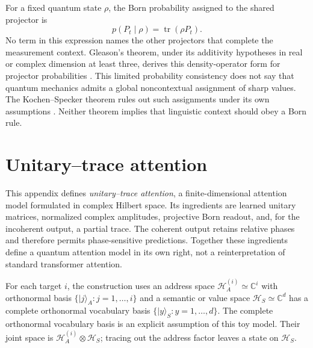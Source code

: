 \documentclass[
  aps,
  reprint,
  superscriptaddress,
  floatfix,
  nofootinbib,
  longbibliography
]{revtex4-2}
\begin{document}
For a fixed quantum state $\rho$, the Born probability assigned to the shared
projector is
\begin{equation}
 p(P_t\mid\rho)=\operatorname{tr}(\rho P_t).
 \label{eq:born-shared-app}
\end{equation}
No term in this expression names the other projectors that complete the
measurement context.  Gleason's theorem, under its additivity hypotheses in
real or complex dimension at least three, derives this density-operator form
for projector probabilities \cite{Gleason}.  This limited probability
consistency does not say that quantum mechanics admits a global
noncontextual assignment of sharp values.  The Kochen--Specker theorem rules
out such assignments under its own assumptions \cite{specker-60,kochen1}.
Neither theorem implies that linguistic context should obey a Born rule.


\section{Unitary--trace attention}
\label{app:quantum-attention}

This appendix defines \emph{unitary--trace attention}, a finite-dimensional
attention model formulated in complex Hilbert space.  Its ingredients are
learned unitary matrices, normalized complex amplitudes, projective Born
readout, and, for the incoherent output, a partial trace.  The coherent output
retains relative phases and therefore permits phase-sensitive predictions.
Together these ingredients define a quantum attention model in its own right,
not a reinterpretation of standard transformer attention.

For each target $i$, the construction uses an address space
$\mathcal H_A^{(i)}\simeq\mathbb C^i$ with orthonormal basis
$\{|j\rangle_A:j=1,\ldots,i\}$ and a semantic or value space
$\mathcal H_S\simeq\mathbb C^d$ has a complete orthonormal vocabulary basis
$\{|y\rangle_S:y=1,\ldots,d\}$.  The complete orthonormal vocabulary basis is
an explicit assumption of this toy model.  Their joint space is
$\mathcal H_A^{(i)}\otimes\mathcal H_S$; tracing out the address factor leaves
a state on $\mathcal H_S$.
\end{document}
